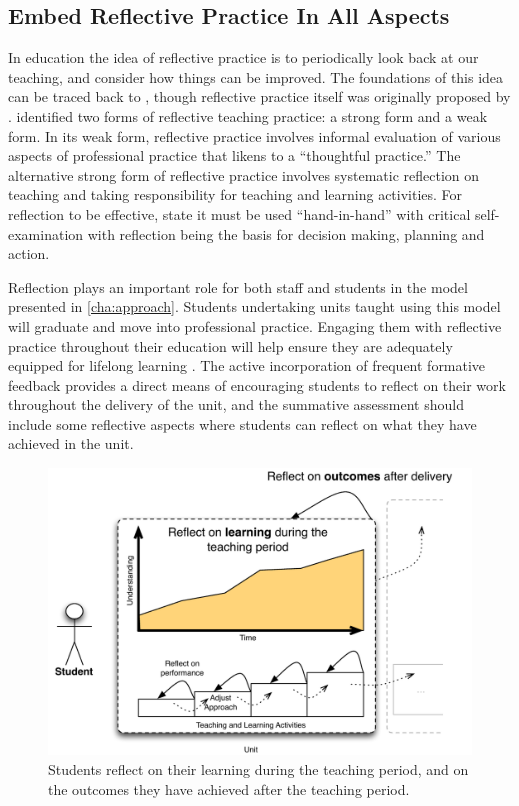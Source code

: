 
\subsection{Embed Reflective Practice In All Aspects} %
\label{ssub:embed_reflective_practice_in_all_aspects}

In education the idea of reflective practice is to periodically look back at our teaching, and consider how things can be improved. The foundations of this idea can be traced back to \citet{Dewey:1933}, though reflective practice itself was originally proposed by \citet{Schon:1983}. \citet{Farrell:2007,Farrell:2008} identified two forms of reflective teaching practice: a strong form and a weak form. In its weak form, reflective practice involves informal evaluation of various aspects of professional practice that \citet{Farrell:2008} likens to a ``thoughtful practice.'' The alternative strong form of reflective practice involves systematic reflection on teaching and taking responsibility for teaching and learning activities. For reflection to be effective, \citet{Richards:1994} state it must be used ``hand-in-hand'' with critical self-examination with reflection being the basis for decision making, planning and action.

Reflection plays an important role for both staff and students in the model presented in \cref{cha:approach}. Students undertaking units taught using this model will graduate and move into professional practice. Engaging them with reflective practice throughout their education will help ensure they are adequately equipped for lifelong learning \cite{Field:2006}. The active incorporation of frequent formative feedback provides a direct means of encouraging students to reflect on their work throughout the delivery of the unit, and the summative assessment should include some reflective aspects where students can reflect on what they have achieved in the unit.

\begin{figure}[ptbh]
	\centering
	\includegraphics[width=\textwidth]{StudentReflection}
	\caption{Students reflect on their learning during the teaching period, and on the outcomes they have achieved after the teaching period.}
	\label{fig:student_reflection}
\end{figure}

